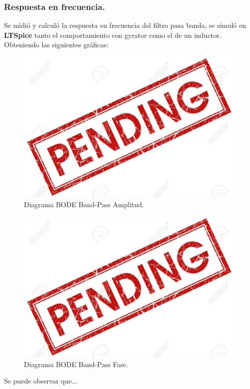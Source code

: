 \documentclass[a4paper]{article}
\begin{document}
\subsubsection{Respuesta en frecuencia.}
Se midió y calculó la respuesta en frecuencia del filtro pasa banda, se simuló en \textbf{LTSpice}  tanto el comportamiento con gyrator como el de un inductor. Obteniendo las siguientes gráficas:
\begin{figure}[H]	
	\centering
	\includegraphics[width=\textwidth]{ImagenesEj2/bodebp.jpg}
	\caption{Diagrama BODE Band-Pass Amplitud.}
	\label{fig:bodebp}
\end{figure}
\begin{figure}[H]	
	\centering
	\includegraphics[width=\textwidth]{ImagenesEj2/bodebpp.jpg}
	\caption{Diagrama BODE Band-Pass Fase.}
	\label{fig:bodebpp}
\end{figure}
Se puede observar que...
\end{document}
